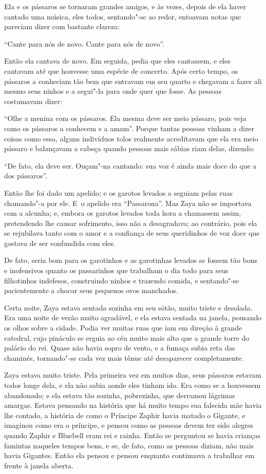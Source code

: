 Ela e os pássaros se tornaram grandes amigos, e às vezes, depois de ela
haver cantado uma música, eles todos, sentando"-se ao redor, entoavam
notas que pareciam dizer com bastante clareza:

``Cante para nós de novo. Cante para nós de novo''.

Então ela cantava de novo. Em seguida, pedia que eles cantassem, e eles
cantavam até que houvesse uma espécie de concerto. Após certo tempo, os
pássaros a conheciam tão bem que entravam em seu quarto e chegavam a
fazer ali mesmo seus ninhos e a segui"-la para onde quer que fosse. As
pessoas costumavam dizer:

``Olhe a menina com os pássaros. Ela mesma deve ser meio pássaro, pois
veja como os pássaros a conhecem e a amam''. Porque tantas pessoas vinham a
dizer coisas como essa, alguns indivíduos tolos realmente acreditavam
que ela era meio pássaro e balançavam a cabeça quando pessoas mais
sábias riam delas, dizendo:

``De fato, ela deve ser. Ouçam"-na cantando: sua voz é ainda mais doce do
que a dos pássaros''.

Então lhe foi dado um apelido; e os garotos levados a seguiam pelas ruas
chamando"-a por ele. E~o apelido era ``Passarona''. Mas Zaya não se
importava com a alcunha; e, embora os garotos levados toda hora a
chamassem assim, pretendendo lhe causar sofrimento, isso não a
desagradava; ao contrário, pois ela se rejubilava tanto com o amor e a
confiança de seus queridinhos de voz doce que gostava de ser confundida
com eles.

De fato, seria bom para os garotinhos e as garotinhas levados se fossem
tão bons e inofensivos quanto os passarinhos que trabalham o dia todo
para seus filhotinhos indefesos, construindo ninhos e trazendo comida, e
sentando"-se pacientemente a chocar seus pequenos ovos manchados.

Certa noite, Zaya estava sentada sozinha em seu sótão, muito triste e
desolada. Era uma noite de verão muito agradável, e ela estava sentada
na janela, pousando os olhos sobre a cidade. Podia ver muitas ruas que
iam em direção à grande catedral, cujo pináculo se erguia ao céu muito
mais alto que a grande torre do palácio do rei. Quase não havia sopro de
vento, e a fumaça subia reta das chaminés, tornando"-se cada vez mais
tênue até desaparecer completamente.


Zaya estava muito triste. Pela primeira vez em muitos dias, seus
pássaros estavam todos longe dela, e ela não sabia aonde eles tinham ido.
Era como se a houvessem abandonado; e ela estava tão sozinha,
pobrezinha, que derramou lágrimas amargas. Estava pensando na história
que há muito tempo sua falecida mãe havia lhe contado, a história de
como o Príncipe Zaphir havia matado o Gigante, e imaginou como era o
príncipe, e pensou como as pessoas devem ter sido alegres quando Zaphir
e Bluebell eram rei e rainha. Então se perguntou se havia crianças
famintas naqueles tempos bons, e se, de fato, como as pessoas diziam,
não mais havia Gigantes. Então ela pensou e pensou enquanto continuava a
trabalhar em frente à janela aberta.


